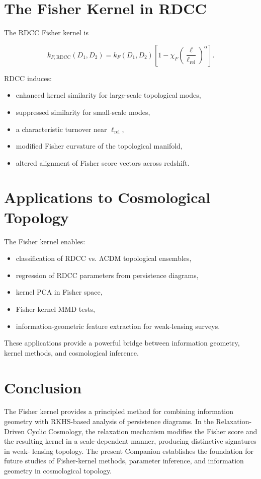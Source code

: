 \documentclass[11pt,a4paper]{article}
\begin{document}
\section{The Fisher Kernel in RDCC}

The RDCC Fisher kernel is

\begin{equation}
    k_{F,\mathrm{RDCC}}(D_{1}, D_{2})
    = k_{F}(D_{1}, D_{2})
      \left[
        1 - \chi_{F}
        \left(\frac{\ell}{\ell_{\mathrm{rel}}}\right)^{\alpha}
      \right].
\end{equation}

RDCC induces:

\begin{itemize}
    \item enhanced kernel similarity for large-scale topological modes,
    \item suppressed similarity for small-scale modes,
    \item a characteristic turnover near $\ell_{\mathrm{rel}}$,
    \item modified Fisher curvature of the topological manifold,
    \item altered alignment of Fisher score vectors across redshift.
\end{itemize}
\section{Applications to Cosmological Topology}

The Fisher kernel enables:

\begin{itemize}
    \item classification of RDCC vs. ΛCDM topological ensembles,
    \item regression of RDCC parameters from persistence diagrams,
    \item kernel PCA in Fisher space,
    \item Fisher-kernel MMD tests,
    \item information-geometric feature extraction for weak-lensing surveys.
\end{itemize}

These applications provide a powerful bridge between information geometry, kernel 
methods, and cosmological inference.
\section{Conclusion}

The Fisher kernel provides a principled method for combining information geometry 
with RKHS-based analysis of persistence diagrams. In the Relaxation-Driven Cyclic 
Cosmology, the relaxation mechanism modifies the Fisher score and the resulting 
kernel in a scale-dependent manner, producing distinctive signatures in weak-
lensing topology. The present Companion establishes the foundation for future 
studies of Fisher-kernel methods, parameter inference, and information geometry in 
cosmological topology.


\nocite{*}

\end{document}
